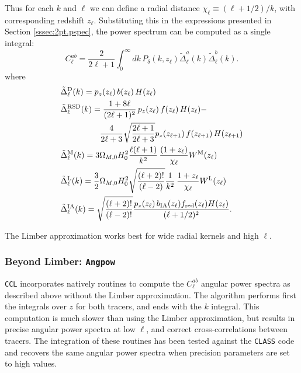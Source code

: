\documentclass[\docopts]{\docclass}
\newcommand{\ccl}{{\tt CCL}\xspace}
\begin{document}
Thus for each $k$ and $\ell$ we can define a radial distance $\chi_\ell\equiv(\ell+1/2)/k$, with corresponding redshift $z_\ell$. Substituting this in the expressions presented in Section \ref{sssec:2pt.pspec}, the power spectrum can be computed as a single integral:
\begin{equation}\label{eq:limber}
 C^{ab}_\ell=\frac{2}{2\ell+1}\int_0^\infty dk\,P_\delta\left(k,z_\ell\right)
 \tilde{\Delta}^a_\ell(k)\tilde{\Delta}^b_\ell(k).
\end{equation}
where
\begin{align}
 &\tilde{\Delta}_\ell^{\rm D}(k)=p_z(z_\ell)\,b(z_\ell)\,H(z_\ell)\\
 &\tilde{\Delta}_\ell^{\rm RSD}(k)=
 \frac{1+8\ell}{(2\ell+1)^2}\,p_z(z_\ell)\,f(z_\ell)\,H(z_\ell)-\\\nonumber
 &\hspace{48pt}\frac{4}{2\ell+3}\sqrt{\frac{2\ell+1}{2\ell+3}}p_z(z_{\ell+1})\,f(z_{\ell+1})\,H(z_{\ell+1})\\
 &\tilde{\Delta}_\ell^{\rm M}(k)=3\Omega_{M,0}H_0^2\frac{\ell(\ell+1)}{k^2}\,
 \frac{(1+z_\ell)}{\chi_\ell}W^{\rm M}(z_\ell)\\
 &\tilde{\Delta}_\ell^{\rm L}(k)=\frac{3}{2}\Omega_{M,0}H_0^2\sqrt{\frac{(\ell+2)!}{(\ell-2)}}\frac{1}{k^2}\,
 \frac{1+z_\ell}{\chi_\ell}W^{\rm L}(z_\ell)\\
 &\tilde{\Delta}_\ell^{\rm IA}(k)=\sqrt{\frac{(\ell+2)!}{(\ell-2)!}}\frac{p_z(z_\ell)\,b_{\rm IA}(z_\ell)f_{\rm red}(z_\ell)H(z_\ell)}{(\ell+1/2)^2}.
\end{align}

The Limber approximation works best for wide radial kernels and high $\ell$.

\subsubsection{Beyond Limber: \texttt{Angpow}}
\label{sec:angpow}

\ccl incorporates natively routines to compute the $C^{ab}_\ell$ angular power spectra as described above without the Limber approximation. The algorithm performs first the integrals over $z$ for both tracers, and ends with the $k$ integral. This computation is much slower than using the Limber approximation, but results in precise angular power spectra at low $\ell$, and correct cross-correlations between tracers. The integration of these routines has been tested against the \texttt{CLASS} code and recovers the same angular power spectra when precision parameters are set to high values.
\end{document}
